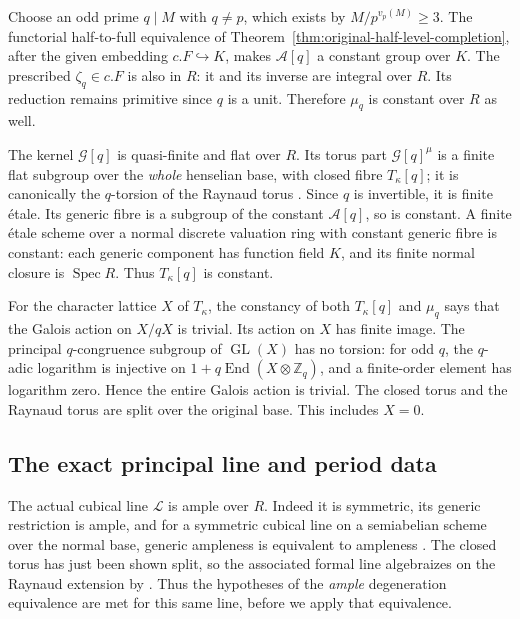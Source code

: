 Choose an odd prime $q\mid M$ with $q\ne p$, which exists by
$M/p^{v_p(M)}\geq3$.  The functorial half-to-full equivalence of
Theorem~\ref{thm:original-half-level-completion}, after the given
embedding $c.F\hookrightarrow K$, makes $\mathcal A[q]$ a constant
group over $K$.  The prescribed $\zeta_q\in c.F$ is also in $R$:
it and its inverse are integral over $R$.  Its reduction remains
primitive since $q$ is a unit.  Therefore $\mu_q$ is constant over
$R$ as well.

The kernel $\mathcal G[q]$ is quasi-finite and flat over $R$.
Its torus part $\mathcal G[q]^\mu$ is a finite flat subgroup over
the \emph{whole} henselian base, with closed fibre $T_\kappa[q]$;
it is canonically the $q$-torsion of the Raynaud torus
\cite[Section 3.4.1 and (3.4.2.1)]{dvr-unif-lan}.
Since $q$ is invertible, it is finite \'etale.  Its generic fibre is
a subgroup of the constant $\mathcal A[q]$, so is constant.  A finite
\'etale scheme over a normal discrete valuation ring with constant
generic fibre is constant: each generic component has function field
$K$, and its finite normal closure is $\operatorname{Spec}R$.
Thus $T_\kappa[q]$ is constant.

For the character lattice $X$ of $T_\kappa$, the constancy of both
$T_\kappa[q]$ and $\mu_q$ says that the Galois action on $X/qX$ is
trivial.  Its action on $X$ has finite image.  The principal
$q$-congruence subgroup of $\operatorname{GL}(X)$ has no torsion:
for odd $q$, the $q$-adic logarithm is injective on
$1+q\operatorname{End}(X\otimes\mathbb Z_q)$, and a finite-order
element has logarithm zero.  Hence the entire Galois action is
trivial.  The closed torus and the Raynaud torus are split over the
original base.  This includes $X=0$.

\subsection*{The exact principal line and period data}

The actual cubical line $\mathscr L$ is ample over $R$.
Indeed it is symmetric, its generic restriction is ample, and for
a symmetric cubical line on a semiabelian scheme over the normal
base, generic ampleness is equivalent to ampleness
\cite[Lemma 4.2.1.6]{dvr-unif-lan}.
The closed torus has just been shown split, so the associated formal
line algebraizes on the Raynaud extension by
\cite[Proposition 3.3.3.11]{dvr-unif-lan}.
Thus the hypotheses of the \emph{ample} degeneration equivalence
are met for this same line, before we apply that equivalence.

